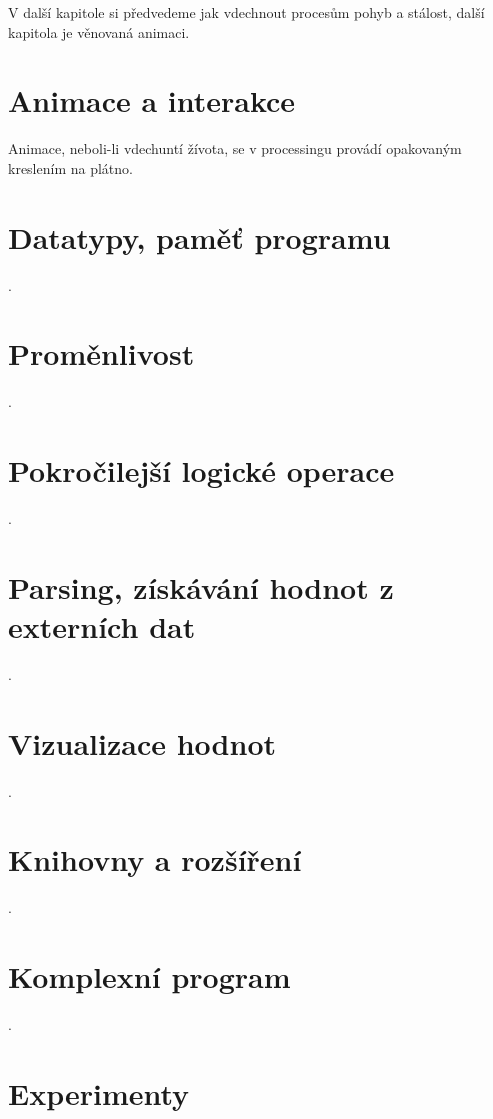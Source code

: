 \documentclass[11pt]{article} %
\begin{document}
V další kapitole si předvedeme jak vdechnout procesům pohyb a stálost, další kapitola je věnovaná animaci.

\section{Animace a interakce}

Animace, neboli-li vdechuntí žívota, se v processingu provádí opakovaným kreslením na plátno.

\newpage
\section{Datatypy, paměť programu}
.
\newpage
\section{Proměnlivost}
.
\newpage
\section{Pokročilejší logické operace}
.
\newpage
\section{Parsing, získávání hodnot z externích dat}
.
\newpage
\section{Vizualizace hodnot}
.
\newpage
\section{Knihovny a rozšíření}
.
\newpage
\section{Komplexní program}
.
\newpage
\section{Experimenty}
\end{document}
